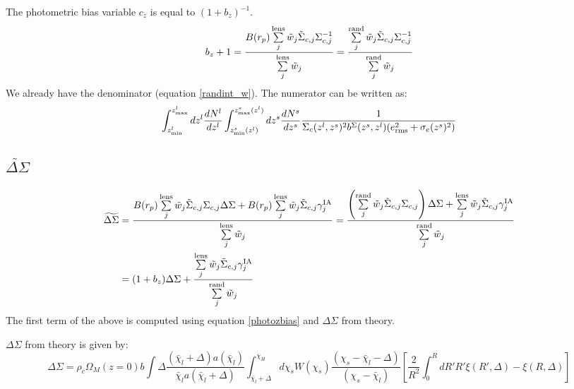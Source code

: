\documentclass[onecolumn,amsmath,aps,fleqn, superscriptaddress]{revtex4}
\begin{document}
The photometric bias variable $c_z$ is equal to $(1+b_z)^{-1}$.
\begin{equation}
b_z+1 = \frac{B(r_p) \sum\limits^{\rm lens}_{j} \tilde{w}_j \tilde{\Sigma}_{c,j} \Sigma_{c,j}^{-1}}{\sum\limits^{\rm lens}_{j} \tilde{w}_j} = \frac{\sum\limits^{\rm rand}_{j} \tilde{w}_j \tilde{\Sigma}_{c,j} \Sigma_{c,j}^{-1}}{\sum\limits^{\rm rand}_{j} \tilde{w}_j}
\label{photozbias}
\end{equation}
We already have the denominator (equation \ref{randint_w}). The numerator can be written as:
\begin{equation}
\int_{z^l_{\rm min}}^{z^l_{\rm max}}dz^l \frac{dN^l}{dz^l} \int_{z^s_{\rm min}(z^l)}^{z^s_{\rm max}(z^l)}dz^s \frac{dN^s}{dz^s}  \frac{1}{\Sigma_c(z^l , z^s)^2 b^{\Sigma}(z^s,z^l) (e_{\rm rms}^2 + \sigma_e(z^s)^2)}
\label{photoz}
\end{equation}

\subsection*{$\widetilde{\Delta \Sigma}$}
\begin{align}
\widetilde{\Delta \Sigma}&= \frac{B(r_p) \sum\limits_{j}^{\rm lens} \tilde{w}_j \tilde{\Sigma}_{c,j} \Sigma_{c,j} \Delta \Sigma + B(r_p) \sum\limits_{j}^{\rm lens} \tilde{w}_j \tilde{\Sigma}_{c,j} \gamma^{\rm IA}_j }{\sum\limits_{j}^{\rm lens} \tilde{w}_j} = \frac{\left(\sum\limits_{j}^{\rm rand} \tilde{w}_j \tilde{\Sigma}_{c,j} \Sigma_{c,j}\right) \Delta \Sigma + \sum\limits_{j}^{\rm lens} \tilde{w}_j \tilde{\Sigma}_{c,j} \gamma^{\rm IA}_j }{\sum\limits_{j}^{\rm rand} \tilde{w}_j} \nonumber \\&= (1+b_z) \Delta \Sigma + \frac{\sum\limits_{j}^{\rm lens} \tilde{w}_j \tilde{\Sigma}_{c,j} \gamma^{\rm IA}_j }{\sum\limits_{j}^{\rm rand} \tilde{w}_j} 
\label{deltasigma}
\end{align}
The first term of the above is computed using equation \ref{photozbias} and $\Delta \Sigma$ from theory. 

$\Delta \Sigma$ from theory is given by:
\begin{equation}
\Delta \Sigma = \rho_c \Omega_M(z=0)b \int \Delta \frac{(\bar{\chi}_l+\Delta) a(\bar{\chi}_l)}{\bar{\chi}_l a(\bar{\chi}_l+\Delta)} \int_{\bar{\chi}_l+\Delta}^{\chi_H}d\chi_s W(\chi_s) \frac{(\chi_s - \bar{\chi}_l-\Delta)}{(\chi_s-\bar{\chi}_l)}\left[\frac{2}{R^2}\int_0^{R}dR' R' \xi(R', \Delta) - \xi(R, \Delta)\right]
\label{DS_the}
\end{equation}
\end{document}
